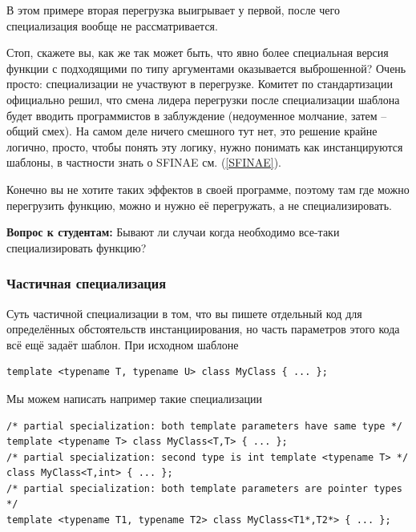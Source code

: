 \documentclass[a4paper,12pt,oneside]{article}
\newif\ifanswers
\begin{document}
В этом примере вторая перегрузка выигрывает у первой, после чего специализация вообще не рассматривается.

Стоп, скажете вы, как же так может быть, что явно более специальная версия функции с подходящими по типу аргументами оказывается выброшенной? Очень просто: специализации не участвуют в перегрузке. Комитет по стандартизации официально решил, что смена лидера перегрузки после специализации шаблона будет вводить программистов в заблуждение (недоуменное молчание, затем -- общий смех). На самом деле ничего смешного тут нет, это решение крайне логично, просто, чтобы понять эту логику, нужно понимать как инстанцируются шаблоны, в частности знать о SFINAE см. (\ref{SFINAE}).

Конечно вы не хотите таких эффектов в своей программе, поэтому там где можно перегрузить функцию, можно и нужно её перегружать, а не специализировать.

\textbf{Вопрос к студентам:} Бывают ли случаи когда необходимо все-таки специализировать функцию?

\ifanswers
Правильный ответ следует из предыдущего параграфа: это как раз те случаи, когда её \textbf{нельзя} перегрузить. Например стандарт регламентирует, что перегрузка функций из пространства имен \lstinline!std! запрещена, но часто хочется \lstinline!std::swap! для своих типов, в этом случае специализация -- единственный выход.
\fi

\subsubsection{Частичная специализация}\label{PartialSpec}

Суть частичной специализации в том, что вы пишете отдельный код для определённых обстоятельств инстанциирования, но часть параметров этого кода всё ещё задаёт шаблон. При исходном шаблоне

\begin{lstlisting}
template <typename T, typename U> class MyClass { ... };
\end{lstlisting}

Мы можем написать например такие специализации

\begin{lstlisting}
/* partial specialization: both template parameters have same type */ 
template <typename T> class MyClass<T,T> { ... }; 
/* partial specialization: second type is int template <typename T> */ 
class MyClass<T,int> { ... }; 
/* partial specialization: both template parameters are pointer types */
template <typename T1, typename T2> class MyClass<T1*,T2*> { ... };
\end{lstlisting}
\end{document}
